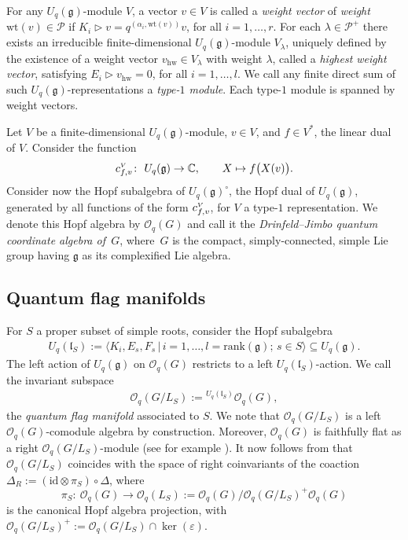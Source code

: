 \documentclass[pdftex]{sigma}
\numberwithin{equation}{section}
\newcommand{\e}{\varepsilon}
\begin{document}
For any $U_q(\mathfrak{g})$-module $V$, a vector $v\in V$ is called a \emph{weight vector} of \emph{weight}~$\mathrm{wt}(v) \in \mathcal{P}$ if
$K_i \triangleright v = q^{(\alpha_i,\mathrm{wt}(v))} v$, for all $i=1,\ldots,r$.
For each $\lambda \in\mathcal{P}^+$ there exists an irreducible finite-dimensional $U_q(\mathfrak{g})$-module $V_\lambda$, uniquely defined by the existence of a weight vector $v_{\mathrm{hw}}\in V_\lambda$ with weight $\lambda$, called a {\em highest weight vector}, satisfying
$E_i \triangleright v_{\mathrm{hw}}=0$,
for all $i = 1, \dots, l$. We call any finite direct sum of such $U_q(\mathfrak{g})$-representations a {\em type-$1$ module}.
Each type-$1$ module is spanned by weight vectors.

Let $V$ be a finite-dimensional $U_q(\mathfrak{g})$-module, $v \in V$, and $f \in V^*$, the linear dual of $V$. Consider the function
\begin{gather*}
c^{\textrm{\tiny $V$}}_{f,v}\colon \ U_q(\mathfrak{g}) \to \mathbb{C}, \qquad X \mapsto f\big(X(v)\big).
\end{gather*}
Consider now the Hopf subalgebra of $U_q(\mathfrak{g})^\circ$, the Hopf dual of $U_q(\mathfrak{g})$, generated by all functions of the form $c^{\textrm{\tiny $V$}}_{f,v}$, for $V$ a type-$1$ representation. We denote this Hopf algebra by $\mathcal{O}_q(G)$ and call it the {\em Drinfeld--Jimbo quantum coordinate algebra of~$G$}, where~$G$ is the compact, simply-connected, simple Lie group having $\mathfrak{g}$ as its complexified Lie algebra.

\subsection{Quantum flag manifolds}\label{section2.5}

For $S$ a proper subset of simple roots, consider the Hopf subalgebra
\begin{gather*}
U_q(\mathfrak{l}_S) := \big\langle K_i, E_s, F_s \,|\, i = 1, \ldots, l = \mathrm{rank}(\mathfrak{g}); \, s \in S \big\rangle \subseteq U_q(\mathfrak{g}).
\end{gather*}
The left action of $U_q(\mathfrak{g})$ on $\mathcal{O}_q(G)$ restricts to a left $U_q(\mathfrak{l}_S)$-action. We call the invariant subspace
\begin{gather*}
\mathcal{O}_q(G/L_S) := {}^{U_q(\mathfrak{l}_S)}\mathcal{O}_q(G),
\end{gather*}
the \emph{quantum flag manifold} associated to $S$. We note that $\mathcal{O}_q(G/L_S)$ is a left $\mathcal{O}_q(G)$-comodule algebra by construction. Moreover, $\mathcal{O}_q(G)$ is faithfully flat as a right $\mathcal{O}_q(G/L_S)$-module (see for example \cite[Section~5.4]{GAPP}). It now follows from \cite[Theorem~1]{Tak} that $\mathcal{O}_q(G/L_S)$ coincides with the space of right coinvariants of the coaction $\Delta_R := ( \mathrm{id}\otimes\pi_S) \circ \Delta$, where
\[
\pi_S\colon \ \mathcal{O}_q(G) \to \mathcal{O}_q(L_S) := \mathcal{O}_q(G)/\mathcal{O}_q(G/L_S)^+\mathcal{O}_q(G)
\]
is the canonical Hopf algebra projection, with $\mathcal{O}_q(G/L_S)^+:=\mathcal{O}_q(G/L_S) \cap \ker(\e)$.
\end{document}
